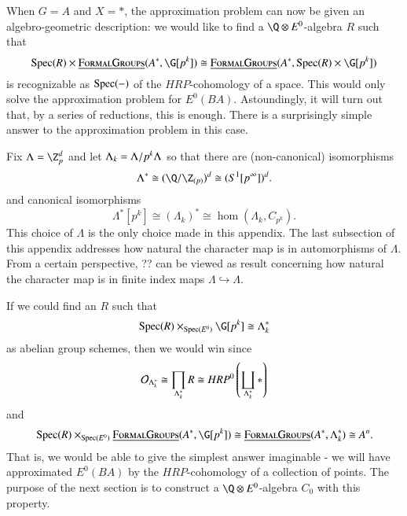When $G = A$ and $X = *$, the approximation problem can now be given an algebro-geometric description: we would like to find a $\Q \otimes E^0$-algebra $R$ such that 
\[
\Spec(R) \times \InternalHom{FormalGroups}(A^*, \G[p^k]) \cong  \InternalHom{FormalGroups}(A^*, \Spec(R) \times \G[p^k])
\]
is recognizable as $\operatorname{Spec}(-)$ of the $HRP$-cohomology of a space. This would only solve the approximation problem for $E^0(BA)$. Astoundingly, it will turn out that, by a series of reductions, this is enough. There is a surprisingly simple answer to the approximation problem in this case. 

Fix $\Lambda = \Z_{p}^{d}$ and let $\Lambda_k = \Lambda/p^k\Lambda$ so that there are (non-canonical) isomorphisms
\[
\Lambda^* \cong (\Q/\Z_{(p)})^d \cong (S^1[p^{\infty}])^d.
\] 
and canonical isomorphisms
\[
\Lambda^*[p^k] \cong (\Lambda_{k})^* \cong \hom(\Lambda_k, C_{p^k}).
\]
This choice of $\Lambda$ is the only choice made in this appendix. The last subsection of this appendix addresses how natural the character map is in automorphisms of $\Lambda$. From a certain perspective, ?? can be viewed as result concerning how natural the character map is in finite index maps $\Lambda \hookrightarrow \Lambda$. 

If we could find an $R$ such that
\[
\Spec(R) \times_{\Spec(E^0)} \G[p^k] \cong \Lk^*
\]
as abelian group schemes, then we would win since
\[
\mathcal{O}_{\Lambda_k^*} \cong \prod_{\Lambda_k^*} R \cong HRP^0\left(\coprod_{\Lambda_k^*} \ast\right)
\]
and
\[
\Spec(R) \times_{\Spec(E^0)} \InternalHom{FormalGroups}(A^*, \G[p^k]) \cong \InternalHom{FormalGroups}(A^*, \Lambda_{k}^*) \cong A^n.
\]
That is, we would be able to give the simplest answer imaginable - we will have approximated $E^0(BA)$ by the $HRP$-cohomology of a collection of points. The purpose of the next section is to construct a $\Q \otimes E^0$-algebra $C_0$ with this property.




